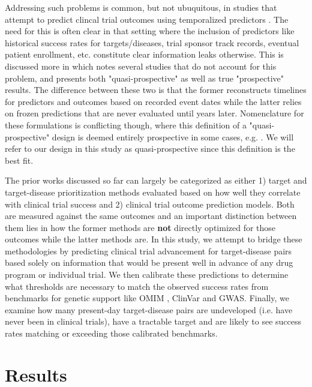 \documentclass{article}
\begin{document}
Addressing such problems is common, but not ubuquitous, in studies that attempt to predict clincal trial outcomes using temporalized predictors \cite{PMID:37483175, PMID:34430930, Lo2019Machine}. The need for this is often clear in that setting where the inclusion of predictors like historical success rates for targets/diseases, trial sponsor track records, eventual patient enrollment, etc. constitute clear information leaks otherwise. This is discussed more in \cite{PMID:37483175} which notes several studies that do not account for this problem, and presents both "quasi-prospective" as well as true "prospective" results. The difference between these two is that the former reconstructs timelines for predictors and outcomes based on recorded event dates while the latter relies on frozen predictions that are never evaluated until years later. Nomenclature for these formulations is conflicting though, where this definition of a "quasi-prospective" design is deemed entirely prospective in some cases, e.g. \cite{PMID:37225853}. We will refer to our design in this study as quasi-prospective since this definition is the best fit.

The prior works discussed so far can largely be categorized as either 1) target and target-disease prioritization methods evaluated based on how well they correlate with clinical trial success and 2) clinical trial outcome prediction models. Both are measured against the same outcomes and an important distinction between them lies in how the former methods are {\bf not} directly optimized for those outcomes while the latter methods are. In this study, we attempt to bridge these methodologies by predicting clinical trial advancement for target-disease pairs based solely on information that would be present well in advance of any drug program or individual trial. We then calibrate these predictions to determine what thresholds are necessary to match the observed success rates from benchmarks for genetic support like OMIM \cite{PMID:15608251}, ClinVar \cite{PMID:24234437} and GWAS. Finally, we examine how many present-day target-disease pairs are undeveloped (i.e. have never been in clinical trials), have a tractable target and are likely to see success rates matching or exceeding those calibrated benchmarks.

\section{Results}
\label{sec:results}
\end{document}
